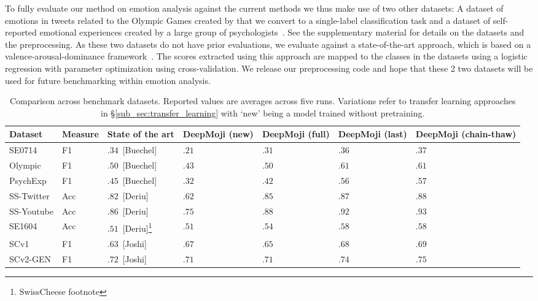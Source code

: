 \documentclass[11pt,a4paper]{article}
\begin{document}
To fully evaluate our method on emotion analysis against the current methods we thus make use of two other datasets: A dataset of emotions in tweets related to the Olympic Games created by \citeauthor{sintsova2013fine} that we convert to a single-label classification task and a dataset of self-reported emotional experiences created by a large group of psychologists~\cite{wallbott1986universal}. See the supplementary material for details on the datasets and the preprocessing. As these two datasets do not have prior evaluations, we evaluate against a state-of-the-art approach, which is based on a valence-arousal-dominance framework~\cite{sven_emotions}. The scores extracted using this approach are mapped to the classes in the datasets using a logistic regression with parameter optimization using cross-validation. We release our preprocessing code and hope that these 2 two datasets will be used for future benchmarking within emotion analysis.


\begin{table*}[h]
\centering
\small
\caption{Comparison across benchmark datasets. Reported values are averages across five runs. Variations refer to transfer learning approaches in \S\ref{sub_sec:transfer_learning} with `new' being a model trained without pretraining.}
\label{tab:benchmark_results}
\begin{center}
\begin{tabular}{lC{1.5cm}L{2.1cm}C{1.8cm}C{1.8cm}C{1.8cm}C{1.8cm}}
\toprule
Dataset & Measure & State of the art & DeepMoji (new) & DeepMoji (full) & DeepMoji (last) & DeepMoji (chain-thaw)\\
\midrule
 SE0714  &  F1 & $.34$~[Buechel] & $.21$ & $.31$ & $.36$ & $\mathbf{.37}$ \\
 Olympic  &  F1 & $.50$~[Buechel] & $.43$ & $.50$ & $\mathbf{.61}$ & $\mathbf{.61}$ \\
 PsychExp  & F1 & $.45$~[Buechel] & $.32$ & $.42$ & $.56$ & $\mathbf{.57}$ \\
\midrule
 SS-Twitter  & Acc & $.82$~[Deriu] & $.62$ & $.85$ & $.87$ & $\mathbf{.88}$ \\  SS-Youtube  & Acc & $.86$~[Deriu] & $.75$ & $.88$ & $.92$ & $\mathbf{.93}$ \\ 
 SE1604  & Acc & $.51$~[Deriu]\footnote{SwissCheese footnote} & $.51$ & $.54$ & $\mathbf{.58}$ & $\mathbf{.58}$ \\ 
 \midrule
 SCv1  & F1 & $.63$~[Joshi] & $.67$ & $.65$ & $.68$ & $\mathbf{.69}$ \\  SCv2-GEN  & F1 & $.72$~[Joshi] & $.71$ & $.71$ & $.74$ & $\mathbf{.75}$ \\ \bottomrule
\end{tabular}
\end{center}
\end{table*}
\end{document}
